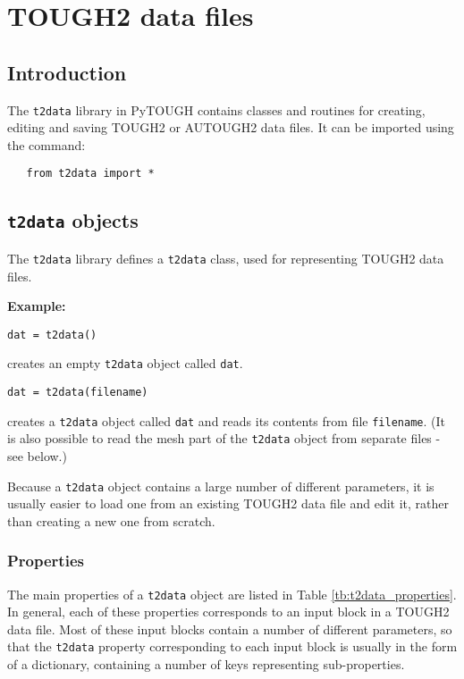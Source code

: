\chapter{TOUGH2 data files}
\label{datafiles}

\section{Introduction}
The \texttt{t2data} library in PyTOUGH contains classes and routines for creating, editing and saving TOUGH2 or AUTOUGH2 data files.  It can be imported using the command:

\begin{lstlisting}
   from t2data import *
\end{lstlisting}

\section{\texttt{t2data} objects}

The \texttt{t2data} library defines a \texttt{t2data} class, used for representing TOUGH2 data files.

\textbf{Example:}

\begin{lstlisting}
dat = t2data()
\end{lstlisting}

creates an empty \texttt{t2data} object called \texttt{dat}.

\begin{lstlisting}
dat = t2data(filename)
\end{lstlisting}

creates a \texttt{t2data} object called \texttt{dat} and reads its contents from file \texttt{filename}.  (It is also possible to read the mesh part of the \texttt{t2data} object from separate files - see below.)

Because a \texttt{t2data} object contains a large number of different parameters, it is usually easier to load one from an existing TOUGH2 data file and edit it, rather than creating a new one from scratch. 

\subsection{Properties}

The main properties of a \texttt{t2data} object are listed in Table \ref{tb:t2data_properties}.  In general, each of these properties corresponds to an input block in a TOUGH2 data file.  Most of these input blocks contain a number of different parameters, so that the \texttt{t2data} property corresponding to each input block is usually in the form of a dictionary, containing a number of keys representing sub-properties.

